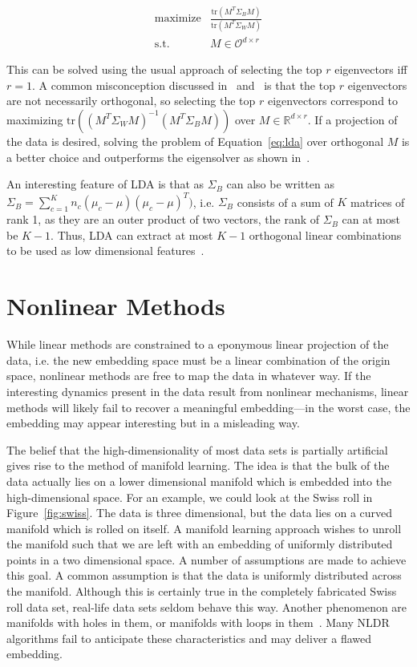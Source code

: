 \begin{eqnarray}
    \text{maximize} & \frac{\text{tr}(M^T \Sigma_B M)}{\text{tr}(M^T \Sigma_W M)}\\
    \text{s.t.} & M \in \mathcal{O}^{d \times r} \nonumber
    \label{eq:lda}
\end{eqnarray}

This can be solved using the usual approach of selecting the top $r$
eigenvectors iff $r=1$.  A common misconception discussed
in~\cite{linearsurvey} and~\cite{fukunaga} is that the top $r$ eigenvectors are
not necessarily orthogonal, so selecting the top $r$ eigenvectors correspond to
maximizing $\text{tr} \left( (M^T\Sigma_W M)^{-1} (M^T\Sigma_BM) \right)$ over
$M \in \mathbb{R}^{d\times r}$. If a projection of the data is desired, solving the problem
of Equation~\ref{eq:lda} over orthogonal $M$ is a better choice and outperforms
the eigensolver as shown in~\cite{linearsurvey}.

An interesting feature of LDA is that as $\Sigma_B$ can also be written as
$\Sigma_B = \sum_{c = 1}^{K} n_c (\mu_c - \mu)(\mu_c - \mu)^T)$, i.e.
$\Sigma_B$ consists of a sum of $K$ matrices of rank 1, as they are an outer
product of two vectors, the rank of $\Sigma_B$ can at most be $K - 1$. Thus,
LDA can extract at most $K - 1$ orthogonal linear combinations to be used as low
dimensional features~\cite{fukunaga}.

\section{Nonlinear Methods}

While linear methods are constrained to a eponymous linear projection of the data, i.e. the
new embedding space must be a linear combination of the origin space, nonlinear methods
are free to map the data in whatever way. If the interesting dynamics present in the
data result from nonlinear mechanisms, linear methods will likely fail to recover
a meaningful embedding---in the worst case, the embedding may appear interesting but
in a misleading way.

The belief that the high-dimensionality of most data sets is partially
artificial gives rise to the method of manifold learning. The idea is that the
bulk of the data actually lies on a lower dimensional manifold which is
embedded into the high-dimensional space.  For an example, we could look at the
Swiss roll in Figure~\ref{fig:swiss}. The data is three dimensional, but
the data lies on a curved manifold which is rolled on itself. A manifold
learning approach wishes to unroll the manifold such that we are left with an
embedding of uniformly distributed points in a two dimensional space. A number
of assumptions are made to achieve this goal. A common assumption is that the
data is uniformly distributed across the manifold. Although this is certainly
true in the completely fabricated Swiss roll data set, real-life data sets
seldom behave this way. Another phenomenon are manifolds with holes in them,
or manifolds with loops in them~\cite{essential_loops}. Many NLDR algorithms
fail to anticipate these characteristics and may deliver a flawed embedding.

